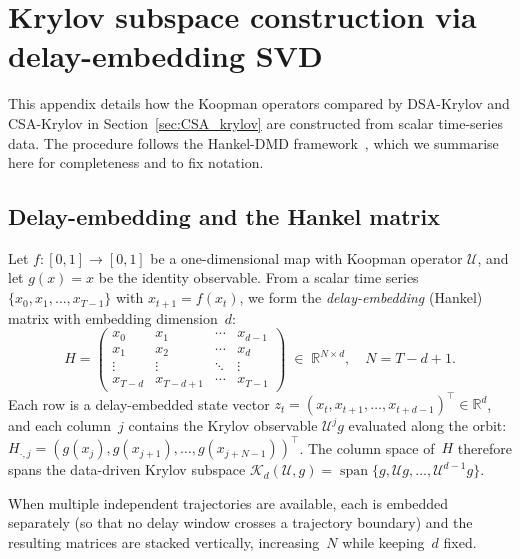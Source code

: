 \documentclass{article}
\theoremstyle{definition}
\begin{document}
\section{Krylov subspace construction via delay-embedding SVD}
\label{app:krylov}

This appendix details how the Koopman operators compared by DSA-Krylov and
CSA-Krylov in Section~\ref{sec:CSA_krylov} are constructed from scalar
time-series data.  The
procedure follows the Hankel-DMD
framework~\citep{arbabi2017ergodic,ostrow2023beyond}, which we summarise here
for completeness and to fix notation.

\subsection{Delay-embedding and the Hankel matrix}

Let $f\colon [0,1]\to[0,1]$ be a one-dimensional map with Koopman operator
$\mathcal{U}$, and let $g(x) = x$ be the identity observable.  From a scalar
time series $\{x_0, x_1, \dots, x_{T-1}\}$ with $x_{t+1} = f(x_t)$, we form
the \emph{delay-embedding} (Hankel) matrix with embedding dimension~$d$:
\begin{equation}\label{eq:hankel}
  H = \begin{pmatrix}
    x_0     & x_1     & \cdots & x_{d-1}   \\
    x_1     & x_2     & \cdots & x_d       \\
    \vdots  & \vdots  & \ddots & \vdots    \\
    x_{T-d} & x_{T-d+1} & \cdots & x_{T-1}
  \end{pmatrix}
  \;\in\; \mathbb{R}^{N \times d},
  \quad N = T - d + 1.
\end{equation}
Each row is a delay-embedded state vector
$z_t = (x_t, x_{t+1}, \dots, x_{t+d-1})^\top \in \mathbb{R}^d$,
and each column~$j$ contains the Krylov observable
$\mathcal{U}^j g$ evaluated along the orbit:
$H_{\cdot,j} = (g(x_j), g(x_{j+1}), \dots, g(x_{j+N-1}))^\top$.
The column space of~$H$ therefore spans the data-driven Krylov subspace
$\mathcal{K}_d(\mathcal{U}, g) =
  \operatorname{span}\{g, \mathcal{U}g, \dots, \mathcal{U}^{d-1}g\}$.

When multiple independent trajectories are available, each is embedded
separately (so that no delay window crosses a trajectory boundary) and the
resulting matrices are stacked vertically, increasing~$N$ while
keeping~$d$ fixed.
\end{document}
